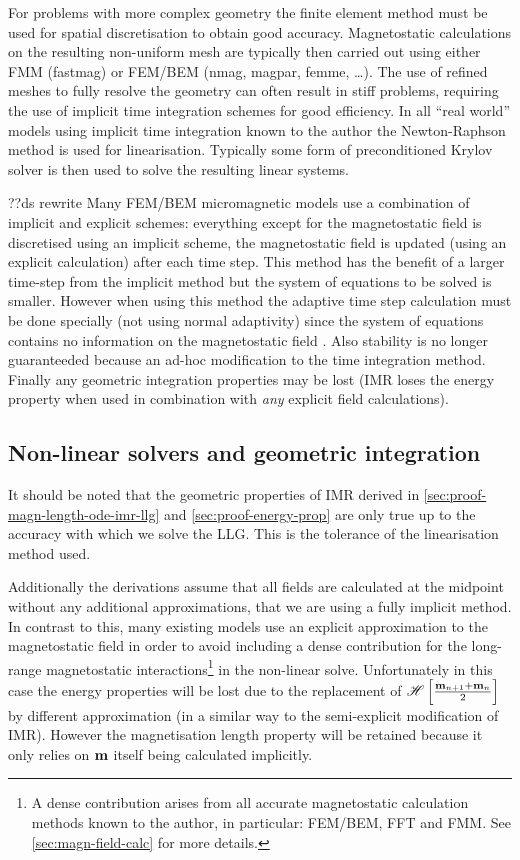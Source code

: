 For problems with more complex geometry the finite element method must be used for spatial discretisation to obtain good accuracy. 
Magnetostatic calculations on the resulting non-uniform mesh are typically then carried out using either FMM (fastmag) or FEM/BEM (nmag, magpar, femme, \ldots).
The use of refined meshes to fully resolve the geometry can often result in stiff problems, requiring the use of implicit time integration schemes for good efficiency.
In all ``real world'' models using implicit time integration known to the author the Newton-Raphson method is used for linearisation.
Typically some form of preconditioned Krylov solver is then used to solve the resulting linear systems.

??ds rewrite
Many FEM/BEM micromagnetic models use a combination of implicit and explicit schemes: everything except for the magnetostatic field is discretised using an implicit scheme, the magnetostatic field is updated (using an explicit calculation) after each time step. 
This method has the benefit of a larger time-step from the implicit method but the system of equations to be solved is smaller.
However when using this method the adaptive time step calculation must be done specially (\ie not using normal adaptivity) since the system of equations contains no information on the magnetostatic field \cite{Schrefl1997}.
Also stability is no longer guaranteeded because an ad-hoc modification to the time integration method.
Finally any geometric integration properties may be lost (\eg IMR loses the energy property when used in combination with \emph{any} explicit field calculations). 

\subsection{Non-linear solvers and geometric integration}

It should be noted that the geometric properties of IMR derived in \cref{sec:proof-magn-length-ode-imr-llg} and \cref{sec:proof-energy-prop} are only true up to the accuracy with which we solve the LLG.
This is the tolerance of the linearisation method used. 

Additionally the derivations assume that all fields are calculated at the midpoint without any additional approximations, \ie that we are using a fully implicit method.
In contrast to this, many existing models use an explicit approximation to the magnetostatic field in order to avoid including a dense contribution for the long-range magnetostatic interactions\footnote{A dense contribution arises from all accurate magnetostatic calculation methods known to the author, in particular: FEM/BEM, FFT and FMM. See \cref{sec:magn-field-calc} for more details.} in the non-linear solve.
Unfortunately in this case the energy properties will be lost due to the replacement of $\mathscr{H} \left[ \frac{\mathbf{m}_{n+1} + \mathbf{m}_n}{2} \right]$ by different approximation (in a similar way to the semi-explicit modification of IMR).
However the magnetisation length property will be retained because it only relies on $\mathbf{m}$ itself being calculated implicitly.

